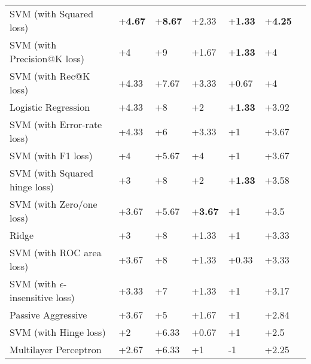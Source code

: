 \begin{table}[h]
{\begin{tabular}{@{}lllllll@{}}
SVM (with Squared loss)                               & +\textbf{4.67}  & +\textbf{8.67}     & +2.33           & +\textbf{1.33}     & +\textbf{4.25} \\
SVM (with Precision@K loss)                            & +4              & +9                 & +1.67           & +\textbf{1.33}     & +4             \\
SVM (with Rec@K loss)                                 & +4.33           & +7.67              & +3.33           & +0.67              & +4             \\
Logistic Regression                                    & +4.33           & +8                 & +2              & +\textbf{1.33}     & +3.92          \\
SVM (with Error-rate loss)                             & +4.33           & +6                 & +3.33           & +1                 & +3.67          \\
SVM (with F1 loss)                                     & +4              & +5.67              & +4              & +1                 & +3.67          \\
SVM (with Squared hinge loss)                           & +3              & +8                 & +2              & +\textbf{1.33}     & +3.58          \\
SVM (with Zero/one loss)                               & +3.67           & +5.67              & +\textbf{3.67}  & +1                 & +3.5           \\
Ridge                                                   & +3              & +8                 & +1.33           & +1                 & +3.33          \\
SVM (with ROC area loss)                                & +3.67           & +8                 & +1.33           & +0.33              & +3.33          \\
SVM (with $\epsilon$-insensitive loss)                   & +3.33           & +7                 & +1.33           & +1                 & +3.17          \\
Passive Aggressive                                       & +3.67           & +5                 & +1.67           & +1                 & +2.84          \\
SVM (with Hinge loss)                                    & +2              & +6.33              & +0.67           & +1                 & +2.5           \\
Multilayer Perceptron                                 & +2.67           & +6.33              & +1              & -1                & +2.25          \\

\end{tabular}}
\end{table}
